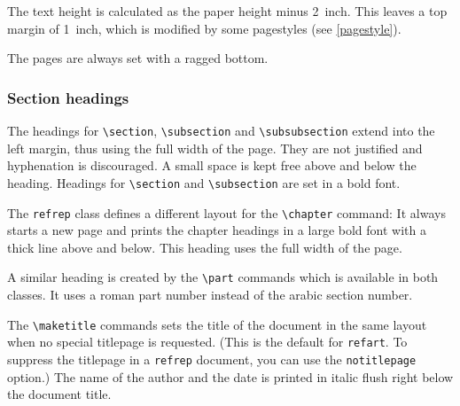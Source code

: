 The text height is calculated as the paper height minus 2~inch. This 
leaves a top margin of 1~inch, which is modified by some pagestyles 
(see \ref{pagestyle}).

The pages are always set with a ragged bottom.

\subsubsection{Section headings}

The headings for \verb|\section|, \verb|\subsection| and 
\verb|\subsubsection| extend into the left margin, thus using the full 
width of the page.  They are not justified and hyphenation is 
discouraged.  A small space is kept free above and below the heading.  
Headings for \verb|\section| and \verb|\subsection| are set in a bold 
font.

The \texttt{refrep} class defines a different layout for the  
\verb|\chapter| command: It always starts a new page and prints the 
chapter headings in a large bold font with a thick line above and 
below. This heading uses the full width of the page.

A similar heading is created by the \verb|\part| commands which is 
available in both classes. It uses a roman part number instead of the 
arabic section number.

The \verb|\maketitle| commands sets the title of the document in the 
same layout when no special titlepage is requested.  (This is the 
default for \texttt{refart}.  To suppress the titlepage in a 
\texttt{refrep} document, you can use the \texttt{notitlepage} option.) 
The name of the author and the date is printed in italic flush right 
below the document title.

